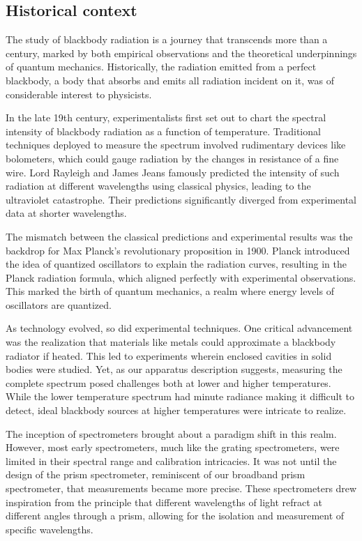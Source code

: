 \documentclass[10pt,letterpaper,onecolumn]{article}
\begin{document}
\subsection{Historical context}

The study of blackbody radiation is a journey that transcends 
more than a century, marked by both empirical observations and 
the theoretical underpinnings of quantum mechanics. Historically, 
the radiation emitted from a perfect blackbody, a body that absorbs 
and emits all radiation incident on it, was of considerable interest 
to physicists.

In the late 19th century, experimentalists first set out to chart the 
spectral intensity of blackbody radiation as a function of temperature. 
Traditional techniques deployed to measure the spectrum involved rudimentary 
devices like bolometers, which could gauge radiation by the changes in 
resistance of a fine wire. Lord Rayleigh and James Jeans famously predicted 
the intensity of such radiation at different wavelengths using classical 
physics, leading to the ultraviolet catastrophe. Their predictions 
significantly diverged from experimental data at shorter wavelengths.

The mismatch between the classical predictions and experimental results was 
the backdrop for Max Planck's revolutionary proposition in 1900. Planck 
introduced the idea of quantized oscillators to explain the radiation curves, 
resulting in the Planck radiation formula, which aligned perfectly with 
experimental observations. This marked the birth of quantum mechanics, a 
realm where energy levels of oscillators are quantized.

As technology evolved, so did experimental techniques. One critical 
advancement was the realization that materials like metals could approximate 
a blackbody radiator if heated. This led to experiments wherein enclosed 
cavities in solid bodies were studied. Yet, as our apparatus description 
suggests, measuring the complete spectrum posed challenges both at lower 
and higher temperatures. While the lower temperature spectrum had minute 
radiance making it difficult to detect, ideal blackbody sources at higher 
temperatures were intricate to realize.

The inception of spectrometers brought about a paradigm shift in this realm. 
However, most early spectrometers, much like the grating spectrometers, 
were limited in their spectral range and calibration intricacies. 
It was not until the design of the prism spectrometer, reminiscent of our 
broadband prism spectrometer, that measurements became more precise. These 
spectrometers drew inspiration from the principle that different wavelengths 
of light refract at different angles through a prism, allowing for the 
isolation and measurement of specific wavelengths.
\end{document}
